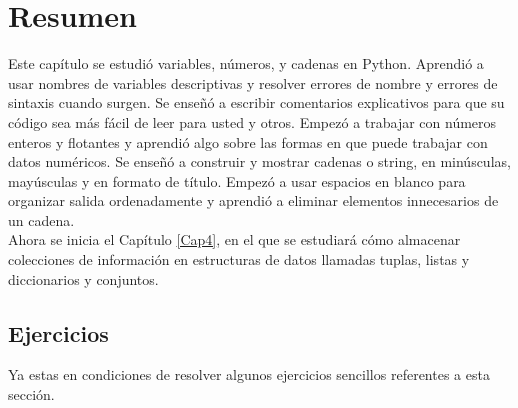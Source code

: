 \section{Resumen}

Este capítulo se estudió  variables, números, y cadenas en Python.  Aprendió a usar nombres de variables descriptivas y resolver errores de nombre y errores de sintaxis cuando surgen. Se enseñó a escribir comentarios explicativos para que su código sea más fácil de leer para usted y otros. Empezó  a trabajar con números enteros y flotantes y aprendió algo sobre las formas en que puede trabajar con datos numéricos.  Se enseñó a construir y  mostrar cadenas o string, en minúsculas, mayúsculas y en formato de título. Empezó  a usar espacios en blanco para organizar salida ordenadamente y aprendió a eliminar elementos innecesarios de un cadena. \\

Ahora se inicia el Capítulo \ref{Cap4}, en el que se estudiará cómo almacenar  colecciones de información en
estructuras de datos llamadas tuplas, listas y diccionarios y conjuntos. 






\subsection{Ejercicios}
Ya estas en condiciones de resolver algunos  ejercicios sencillos referentes a esta sección.



